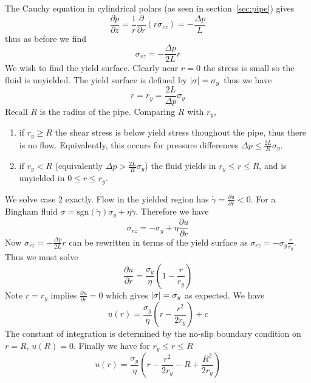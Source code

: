 \documentclass{jknotes}
\newcommand{\srate}{\dot{\gamma}}
\begin{document}
The Cauchy equation in cylindrical polars (as seen in section~\ref{sec:pipe})
gives
\begin{equation}
	\frac{\partial p}{\partial z} = \frac{1}{r} \frac{\partial}{\partial r}
	\left( r \sigma_{rz} \right) = -\frac{\Delta p}{L}
\end{equation}
thus as before we find
\begin{equation}
	\sigma_{rz} = -\frac{\Delta p}{2L} r
\end{equation}
We wish to find the yield surface. Clearly near $r=0$ the stress is small
so the fluid is unyielded. The yield surface is defined by $\abs{\sigma} =
\sigma_y$ thus we have
\begin{equation}
	r = r_y = \frac{2L}{\Delta p} \sigma_y
\end{equation}
Recall $R$ is the radius of the pipe. Comparing $R$ with $r_y$,
\begin{enumerate}
	\item if $r_y \ge R$ the shear stress is below yield stress thoughout the
		pipe, thus there is no flow. Equivalently, this occurs for pressure
		differences $\Delta p \le \frac{2L}{R} \sigma_y$.
	\item if $r_y < R$ (equivalently $\Delta p > \frac{2L}{R} \sigma_y$) the
		fluid yields in $r_y \le r \le R$, and is unyielded in $0 \le r \le
		r_y$.
\end{enumerate}

We solve case 2 exactly. Flow in the yielded region has $\srate =
\frac{\partial u}{\partial r} < 0$. For a Bingham fluid $\sigma =
\text{sgn}(\srate) \sigma_y + \eta \srate$. Therefore we have
\begin{equation}
	\sigma_{rz} = -\sigma_y + \eta \frac{\partial u}{\partial r}
\end{equation}
Now $\sigma_{rz} = -\frac{\Delta p}{2L} r$ can be rewritten in terms of the
yield surface as $\sigma_{rz} = -\sigma_y \frac{r}{r_y}$. Thus we must solve
\begin{equation}
	\frac{\partial u}{\partial r} = \frac{\sigma_y}{\eta}\left( 1 -
	\frac{r}{r_y}\right)
\end{equation}
Note $r = r_y$ implies $\frac{\partial u}{\partial r} = 0$ which gives
$\abs{\sigma} = \sigma_y$ as expected. We have
\begin{equation}
u(r) = \frac{\sigma_y}{\eta} \left(r - \frac{r^2}{2r_y}\right) + c
\end{equation}
The constant of integration is determined by the no-slip boundary condition on
$r=R$, $u(R) = 0$. Finally we have for $r_y \le r \le R$
\begin{equation}
	u(r) = \frac{\sigma_y}{\eta} \left( r - \frac{r^2}{2r_y} - R +
	\frac{R^2}{2r_y}\right)
\end{equation}
\end{document}
